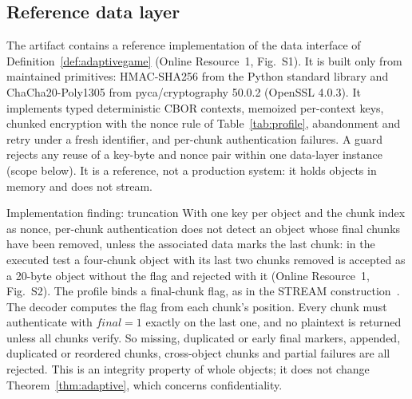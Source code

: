 \documentclass[pdflatex,sn-mathphys-num]{sn-jnl}%
\theoremstyle{plain}
\theoremstyle{definition}
\begin{document}
\subsection{Reference data layer}\label{sec:datalayer}
The artifact contains a reference implementation of the data interface of Definition~\ref{def:adaptivegame} (Online Resource~1, Fig.~S1). It is built only from maintained primitives: HMAC-SHA256 from the Python standard library and ChaCha20-Poly1305 from pyca/cryptography 50.0.2 (OpenSSL 4.0.3). It implements typed deterministic CBOR contexts, memoized per-context keys, chunked encryption with the nonce rule of Table~\ref{tab:profile}, abandonment and retry under a fresh identifier, and per-chunk authentication failures. A guard rejects any reuse of a key-byte and nonce pair within one data-layer instance (scope below). It is a reference, not a production system: it holds objects in memory and does not stream.


\begin{implbox}{Implementation finding: truncation}
With one key per object and the chunk index as nonce, per-chunk authentication does not detect an object whose final chunks have been removed, unless the associated data marks the last chunk: in the executed test a four-chunk object with its last two chunks removed is accepted as a 20-byte object without the flag and rejected with it (Online Resource~1, Fig.~S2). The profile binds a final-chunk flag, as in the STREAM construction~\cite{hoang2015}. The decoder computes the flag from each chunk's position. Every chunk must authenticate with $\mathit{final}=1$ exactly on the last one, and no plaintext is returned unless all chunks verify. So missing, duplicated or early final markers, appended, duplicated or reordered chunks, cross-object chunks and partial failures are all rejected. This is an integrity property of whole objects; it does not change Theorem~\ref{thm:adaptive}, which concerns confidentiality.
\end{implbox}
\end{document}
